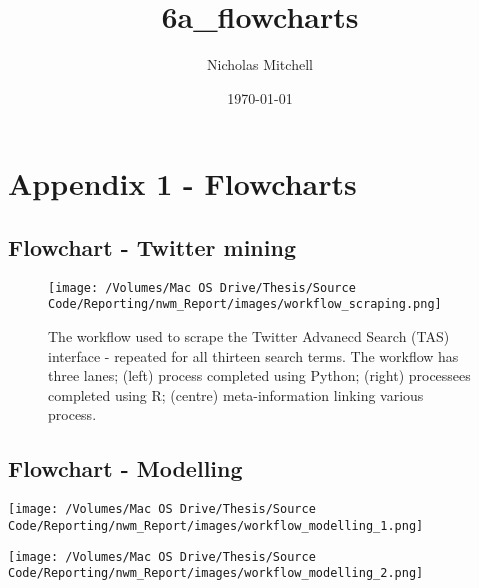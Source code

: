 \documentclass{article}
\author{Nicholas Mitchell}
\date{\today}
\title{6a\_flowcharts}
\begin{document}
\maketitle
\tableofcontents



\section{Appendix 1 - Flowcharts \label{flowcharts}}
\label{sec-1}


\subsection{Flowchart - Twitter mining \label{flowchart-twitter-mining}}
\label{sec-1-1}

\begin{wrapfigure}{l}{0.5\textwidth}
\centering
\texttt{[image: /Volumes/Mac OS Drive/Thesis/Source Code/Reporting/nwm\_Report/images/workflow\_scraping.png]}
\caption{\label{flowchart-scraping}The workflow used to scrape the Twitter Advanecd Search (TAS) interface - repeated for all thirteen search terms. The workflow has three lanes; (left) process completed using Python; (right) processees completed using R; (centre) meta-information linking various process.}
\end{wrapfigure}

\subsection{Flowchart - Modelling \label{flowchart-mod}}
\label{sec-1-2}

\texttt{[image: /Volumes/Mac OS Drive/Thesis/Source Code/Reporting/nwm\_Report/images/workflow\_modelling\_1.png]}

\texttt{[image: /Volumes/Mac OS Drive/Thesis/Source Code/Reporting/nwm\_Report/images/workflow\_modelling\_2.png]}

\pagebreak
\end{document}
